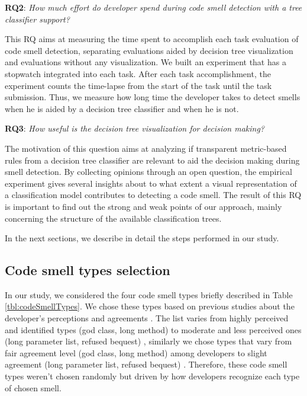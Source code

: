 
\textbf{RQ2}: \textit{How much effort do developer spend during code smell detection with a tree classifier support?}

This RQ aims at measuring the time spent to accomplish each task evaluation of code smell detection, separating evaluations aided by decision tree visualization and evaluations without any visualization. We built an experiment that has a stopwatch integrated into each task. After each task accomplishment, the experiment counts the time-lapse from the start of the task until the task submission. Thus, we measure how long time the developer takes to detect smells when he is aided by a decision tree classifier and when he is not.

\textbf{RQ3}: \textit{How useful is the decision tree visualization for decision making?}

The motivation of this question aims at analyzing if transparent metric-based rules from a decision tree classifier are relevant to aid the decision making during smell detection. By collecting opinions through an open question, the empirical experiment gives several insights about to what extent a visual representation of a classification model contributes to detecting a code smell. The result of this RQ is important to find out the strong and weak points of our approach, mainly concerning the structure of the available classification trees.

In the next sections, we describe in detail the steps performed in our study.

\subsection{Code smell types selection} \label{sec:codeSmellTypes}

In our study, we considered the four code smell types briefly described in Table \ref{tbl:codeSmellTypes}. We chose these types based on previous studies about the developer’s perceptions \cite{palomba2014they}  and agreements \cite{hozano2018you}. The list
varies from highly perceived and identified types (god class, long
method) to moderate and less perceived ones (long parameter list,
refused bequest) \cite{palomba2014they}, similarly we chose types that vary from fair
agreement level (god class, long method) among developers to
slight agreement (long parameter list, refused bequest) \cite{hozano2018you}. Therefore, these code smell types weren't chosen randomly but driven by how developers recognize each type of chosen smell.

